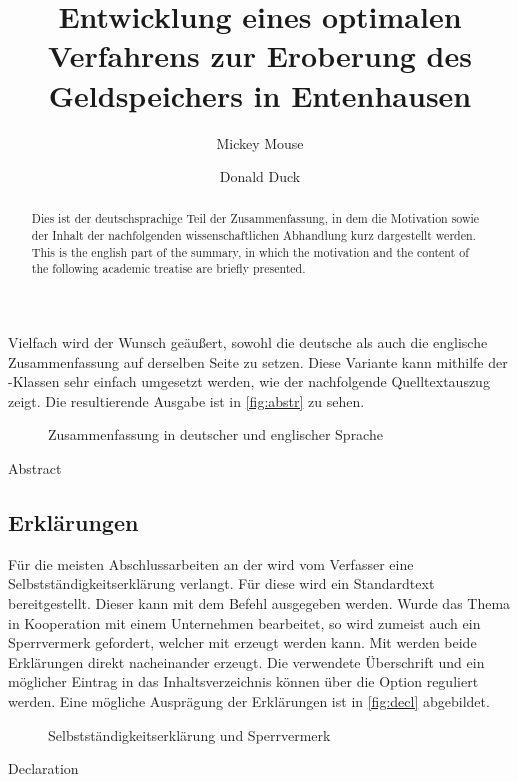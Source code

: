 \documentclass[english,ngerman]{tudscrartcl}
\begin{document}
Vielfach wird der Wunsch geäußert, sowohl die deutsche als auch die englische 
Zusammenfassung auf derselben Seite zu setzen. Diese Variante kann mithilfe 
der \TUDScript-Klassen sehr einfach umgesetzt werden, wie der nachfolgende 
Quelltextauszug zeigt. Die resultierende Ausgabe ist in \autoref{fig:abstr} zu 
sehen.
\begin{figure}
\centering
{}
\caption{Zusammenfassung in deutscher und englischer Sprache}
\label{fig:abstr}
\end{figure}
\begin{Tutorial+}{Abstract}
\begin{abstract}
  Dies ist der deutschsprachige Teil der Zusammenfassung, in dem die
  Motivation sowie der Inhalt der nachfolgenden wissenschaftlichen
  Abhandlung kurz dargestellt werden.
\nextabstract[english]
  This is the english part of the summary, in which the motivation and
  the content of the following academic treatise are briefly presented.
\end{abstract}
\end{Tutorial+}


\subsection{Erklärungen}
Für die meisten Abschlussarbeiten an der \TnUD wird vom Verfasser eine 
Selbstständigkeitserklärung verlangt. Für diese wird ein Standardtext 
bereitgestellt. Dieser kann mit dem Befehl  ausgegeben 
werden. Wurde das Thema in Kooperation mit einem Unternehmen bearbeitet, so 
wird zumeist auch ein Sperrvermerk gefordert, welcher mit  
erzeugt werden kann. Mit  werden beide Erklärungen direkt 
nacheinander erzeugt. Die verwendete Überschrift und ein möglicher Eintrag in 
das Inhaltsverzeichnis können über die Option  reguliert 
werden. Eine mögliche Ausprägung der Erklärungen ist in \autoref{fig:decl} 
abgebildet.
\begin{figure}
\centering
{}
\caption{Selbstständigkeitserklärung und Sperrvermerk}
\label{fig:decl}
\end{figure}
\begin{Tutorial+}{Declaration}
\title{%
  Entwicklung eines optimalen Verfahrens zur Eroberung des
  Geldspeichers in Entenhausen
}
\author{Mickey Mouse\and Donald Duck}
\declaration[company=FIRMA]
\end{Tutorial+}
\end{document}
